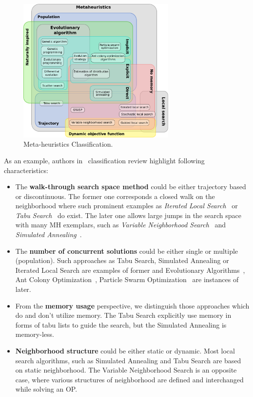 \begin{figure}
	\centering
	\includegraphics[width=0.7\textwidth]{graphics/Background/Metaheuristics_classification}
	\caption{Meta-heuristics Classification.}
	\label{BG: MH classification}
\end{figure}

As an example, authors in~\cite{birattari2001classification} classification review highlight following characteristics:
\begin{itemize}[itemsep=8pt]
	\item The \textbf{walk-through search space method} could be either trajectory based or discontinuous. The former one corresponds a closed walk on the neighborhood where such prominent examples as \textit{Iterated Local Search}~\cite{lourencco2003iterated} or \textit{Tabu Search}~\cite{glover1989tabu} do exist. The later one allows large jumps in the search space with many MH exemplars, such as \textit{Variable Neighborhood Search}~\cite{hansen2003variable} and \textit{Simulated Annealing}~\cite{kirkpatrick1983optimization}.
	
	\item The \textbf{number of concurrent solutions} could be either single or multiple (population). Such approaches as Tabu Search, Simulated Annealing or Iterated Local Search are examples of former and Evolutionary Algorithms~\cite{eiben2015evolutionary}, Ant Colony Optimization~\cite{dorigo2007ant}, Particle Swarm Optimization~\cite{kennedy1995particle} are instances of later.
	
	\item From the \textbf{memory usage} perspective, we distinguish those approaches which do and don't utilize memory. The Tabu Search explicitly use memory in forms of tabu lists to guide the search, but the Simulated Annealing is memory-less.
	
	\item \textbf{Neighborhood structure} could be either static or dynamic. Most local search algorithms, such as Simulated Annealing and Tabu Search are based on static neighborhood. The Variable Neighborhood Search is an opposite case, where various structures of neighborhood are defined and interchanged while solving an OP. 
\end{itemize}

